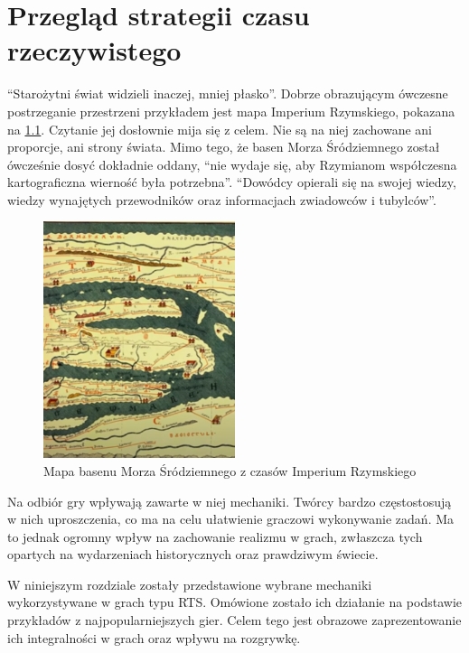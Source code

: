 \chapter{Przegląd strategii czasu rzeczywistego}

“Starożytni świat widzieli inaczej, mniej płasko”\cite{gbobrektvgry}. Dobrze obrazującym ówczesne postrzeganie przestrzeni przykładem jest mapa Imperium Rzymskiego,
pokazana na \ref{fig:mapaIR}. Czytanie jej dosłownie mija się z celem. Nie są na niej zachowane ani proporcje, ani strony świata. Mimo tego, że
basen Morza Śródziemnego został ówcześnie dosyć dokładnie oddany, “nie wydaje się, aby Rzymianom współczesna kartograficzna wierność była potrzebna”\cite{gbobrektvgry}.
“Dowódcy opierali się na swojej wiedzy, wiedzy wynajętych przewodników oraz informacjach zwiadowców i tubylców”\cite{gbobrektvgry}.
\begin{figure}[htbp]
    \centering
    \includegraphics[width=0.5\textwidth]{images/mapaIR.png}
    \caption{Mapa basenu Morza Śródziemnego z czasów Imperium Rzymskiego}\label{fig:mapaIR}
\end{figure}

Na odbiór gry wpływają zawarte w niej mechaniki. Twórcy bardzo częstostosują w nich uproszczenia, co ma na celu
ułatwienie graczowi wykonywanie zadań. Ma to jednak ogromny wpływ na zachowanie realizmu w grach, zwłaszcza tych opartych
na wydarzeniach historycznych oraz prawdziwym świecie. 

W niniejszym rozdziale zostały przedstawione wybrane mechaniki wykorzystywane w grach typu RTS. Omówione zostało ich
działanie na podstawie przykładów z najpopularniejszych gier. Celem tego jest obrazowe zaprezentowanie ich integralności
w grach oraz wpływu na rozgrywkę.